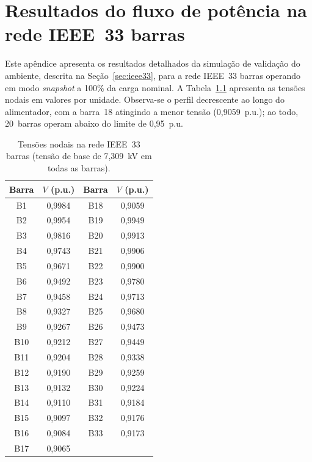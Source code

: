 \chapter{Resultados do fluxo de potência na rede IEEE~33 barras}
\label{ap:fluxo33}

Este apêndice apresenta os resultados detalhados da simulação de validação do ambiente, descrita na Seção~\ref{sec:ieee33}, para a rede IEEE~33 barras operando em modo \emph{snapshot} a 100\% da carga nominal. A Tabela~\ref{tab:tensoes33} apresenta as tensões nodais em valores por unidade. Observa-se o perfil decrescente ao longo do alimentador, com a barra~18 atingindo a menor tensão (0,9059~p.u.); ao todo, 20~barras operam abaixo do limite de 0,95~p.u.

\begin{table}[!htb]
  \centering
  \caption{Tensões nodais na rede IEEE~33 barras (tensão de base de 7,309~kV em todas as barras).}
  \label{tab:tensoes33}
  \footnotesize
  \begin{tabular}{@{}cc@{\hspace{1.5cm}}cc@{}}
    \toprule
    \textbf{Barra} & \textbf{$V$ (p.u.)} & \textbf{Barra} & \textbf{$V$ (p.u.)} \\
    \midrule
    B1  & 0,9984 & B18 & 0,9059 \\
    B2  & 0,9954 & B19 & 0,9949 \\
    B3  & 0,9816 & B20 & 0,9913 \\
    B4  & 0,9743 & B21 & 0,9906 \\
    B5  & 0,9671 & B22 & 0,9900 \\
    B6  & 0,9492 & B23 & 0,9780 \\
    B7  & 0,9458 & B24 & 0,9713 \\
    B8  & 0,9327 & B25 & 0,9680 \\
    B9  & 0,9267 & B26 & 0,9473 \\
    B10 & 0,9212 & B27 & 0,9449 \\
    B11 & 0,9204 & B28 & 0,9338 \\
    B12 & 0,9190 & B29 & 0,9259 \\
    B13 & 0,9132 & B30 & 0,9224 \\
    B14 & 0,9110 & B31 & 0,9184 \\
    B15 & 0,9097 & B32 & 0,9176 \\
    B16 & 0,9084 & B33 & 0,9173 \\
    B17 & 0,9065 &     &        \\
    \bottomrule
  \end{tabular}
  \par\vspace{2pt}
\end{table}

